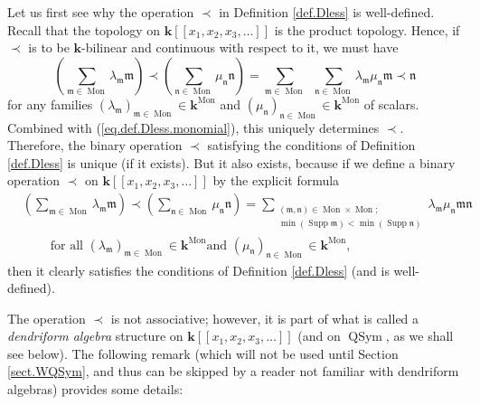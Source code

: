 \documentclass[numbers=enddot,12pt,final,onecolumn,notitlepage,abstracton]{scrartcl}%
\theoremstyle{definition}
\let\sumnonlimits\sum
\renewcommand{\sum}{\sumnonlimits\limits}
\begin{document}
Let us first see why the operation $\left.  \prec\right.  $ in Definition
\ref{def.Dless} is well-defined. Recall that the topology on $\mathbf{k}%
\left[  \left[  x_{1},x_{2},x_{3},\ldots\right]  \right]  $ is the product
topology. Hence, if $\left.  \prec\right.  $ is to be $\mathbf{k}$-bilinear
and continuous with respect to it, we must have%
\[
\left(  \sum_{\mathfrak{m}\in\operatorname*{Mon}}\lambda_{\mathfrak{m}%
}\mathfrak{m}\right)  \left.  \prec\right.  \left(  \sum_{\mathfrak{n}%
\in\operatorname*{Mon}}\mu_{\mathfrak{n}}\mathfrak{n}\right)  =\sum
_{\mathfrak{m}\in\operatorname*{Mon}}\ \ \sum_{\mathfrak{n}\in
\operatorname*{Mon}}\lambda_{\mathfrak{m}}\mu_{\mathfrak{n}}\mathfrak{m}%
\left.  \prec\right.  \mathfrak{n}%
\]
for any families $\left(  \lambda_{\mathfrak{m}}\right)  _{\mathfrak{m}%
\in\operatorname*{Mon}}\in\mathbf{k}^{\operatorname*{Mon}}$ and $\left(
\mu_{\mathfrak{n}}\right)  _{\mathfrak{n}\in\operatorname*{Mon}}\in
\mathbf{k}^{\operatorname*{Mon}}$ of scalars. Combined with
(\ref{eq.def.Dless.monomial}), this uniquely determines $\left.  \prec\right.
$. Therefore, the binary operation $\left.  \prec\right.  $ satisfying the
conditions of Definition \ref{def.Dless} is unique (if it exists). But it also
exists, because if we define a binary operation $\left.  \prec\right.  $ on
$\mathbf{k}\left[  \left[  x_{1},x_{2},x_{3},\ldots\right]  \right]  $ by the
explicit formula%
\begin{align*}
&  \left(  \sum_{\mathfrak{m}\in\operatorname*{Mon}}\lambda_{\mathfrak{m}%
}\mathfrak{m}\right)  \left.  \prec\right.  \left(  \sum_{\mathfrak{n}%
\in\operatorname*{Mon}}\mu_{\mathfrak{n}}\mathfrak{n}\right)  =\sum
_{\substack{\left(  \mathfrak{m},\mathfrak{n}\right)  \in\operatorname*{Mon}%
\times\operatorname*{Mon}\text{;}\\\min\left(  \operatorname*{Supp}%
\mathfrak{m}\right)  <\min\left(  \operatorname*{Supp}\mathfrak{n}\right)
}}\lambda_{\mathfrak{m}}\mu_{\mathfrak{n}}\mathfrak{mn}\\
&  \ \ \ \ \ \ \ \ \ \ \text{for all }\left(  \lambda_{\mathfrak{m}}\right)
_{\mathfrak{m}\in\operatorname*{Mon}}\in\mathbf{k}^{\operatorname*{Mon}}\text{
and }\left(  \mu_{\mathfrak{n}}\right)  _{\mathfrak{n}\in\operatorname*{Mon}%
}\in\mathbf{k}^{\operatorname*{Mon}},
\end{align*}
then it clearly satisfies the conditions of Definition \ref{def.Dless} (and is well-defined).

The operation $\left.  \prec\right.  $ is not associative; however, it is part
of what is called a \textit{dendriform algebra} structure on $\mathbf{k}%
\left[  \left[  x_{1},x_{2},x_{3},\ldots\right]  \right]  $ (and on
$\operatorname*{QSym}$, as we shall see below). The following remark (which
will not be used until Section \ref{sect.WQSym}, and thus can be skipped by a
reader not familiar with dendriform algebras) provides some details:
\end{document}
